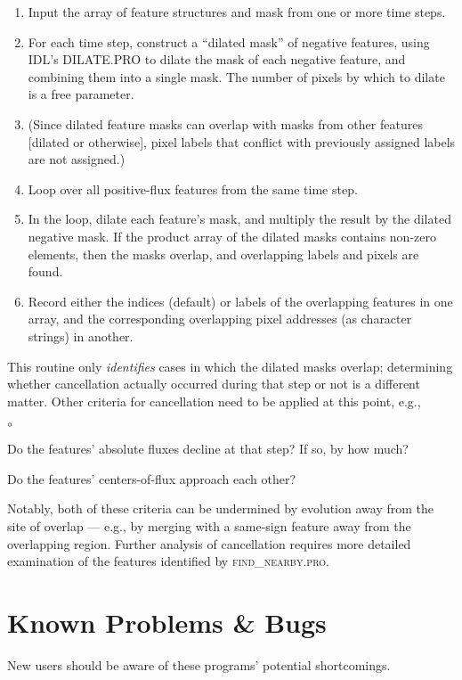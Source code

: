 \documentclass[12pt,preprint]{aastex}
\begin{document}
%
\begin{enumerate}
%
\item Input the array of feature structures and mask from one or more
time steps.
%
\item For each time step, construct a ``dilated mask'' of negative
features, using IDL's DILATE.PRO to dilate the mask of each negative
feature, and combining them into a single mask.  The number of pixels
by which to dilate is a free parameter.
%
\item (Since dilated feature masks can overlap with masks from other
features [dilated or otherwise], pixel labels that conflict with
previously assigned labels are not assigned.)
% 
\item Loop over all positive-flux features from the same time step. 
%
\item In the loop, dilate each feature's mask, and multiply the result
by the dilated negative mask.  If the product array of the dilated
masks contains non-zero elements, then the masks overlap, and
overlapping labels and pixels are found.
%
\item Record either the indices (default) or labels of the overlapping
features in one array, and the corresponding overlapping pixel
addresses (as character strings) in another.
%
\end{enumerate}
%
This routine only {\em identifies} cases in which the dilated masks
overlap; determining whether cancellation actually occurred during
that step or not is a different matter.  Other criteria for
cancellation need to be applied at this point, e.g.,
\begin{list}{$\circ$}{}
%
\item Do the features' absolute fluxes decline at that step?  If so,
by how much?  
%
\item Do the features' centers-of-flux approach each other?  
%
\end{list}
%
Notably, both of these criteria can be undermined by evolution away
from the site of overlap --- e.g., by merging with a same-sign feature
away from the overlapping region.  Further analysis of cancellation
requires more detailed examination of the features identified by
\textsc{find\_nearby.pro}.  

\section{Known Problems \& Bugs}

New users should be aware of these programs' potential shortcomings.
\end{document}
